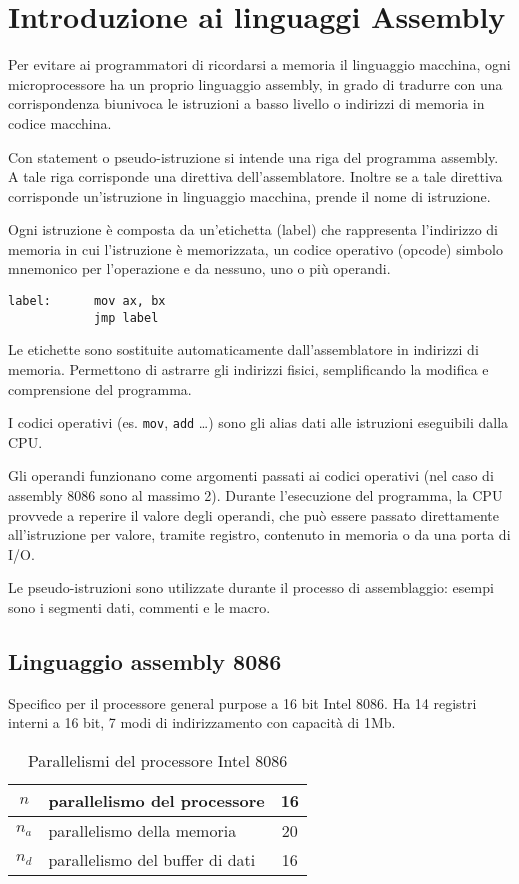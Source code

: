 \documentclass[../template]{subfiles}
\begin{document}
\section{Introduzione ai linguaggi Assembly}
Per evitare ai programmatori di ricordarsi a memoria il linguaggio macchina, ogni microprocessore ha un proprio
linguaggio assembly, in grado di tradurre con una corrispondenza biunivoca le istruzioni a basso livello o indirizzi di memoria in codice macchina.

Con statement o pseudo-istruzione si intende una riga del programma assembly. A tale riga corrisponde una direttiva
dell'assemblatore.  Inoltre se a tale direttiva corrisponde un'istruzione in linguaggio macchina, prende il nome di
istruzione.

Ogni istruzione è composta da un'etichetta (label) che rappresenta l'indirizzo di memoria in cui l'istruzione è
memorizzata, un codice operativo (opcode) simbolo mnemonico per l'operazione e da nessuno, uno o più operandi.

\begin{lstlisting}
label:      mov ax, bx
            jmp label
\end{lstlisting}

Le etichette sono sostituite automaticamente dall'assemblatore in indirizzi di memoria. Permettono di astrarre gli
indirizzi fisici, semplificando la modifica e comprensione del programma.

I codici operativi (es. \lstinline{mov}, \lstinline{add} \dots) sono gli alias dati alle istruzioni eseguibili dalla
CPU.

Gli operandi funzionano come argomenti passati ai codici operativi (nel caso di assembly 8086 sono al massimo 2).
Durante l'esecuzione del programma, la CPU provvede a reperire il valore degli operandi, che può essere passato
direttamente all'istruzione per valore, tramite registro, contenuto in memoria o da una porta di I/O.

Le pseudo-istruzioni sono utilizzate durante il processo di assemblaggio: esempi sono i segmenti dati, commenti  e le
macro.
\subsection{Linguaggio assembly 8086}
Specifico per il processore general purpose a 16 bit Intel 8086.
Ha 14 registri interni a 16 bit, 7 modi di indirizzamento con capacità di 1Mb.

\begin{table}[h]
    \centering
    \begin{tabu}{|c|l|c|}
        \hline
        $n$   & parallelismo del processore & 16\\
        \hline
        $n_a$ & parallelismo della memoria & 20\\
        \hline
        $n_d$ & parallelismo del buffer di dati & 16\\
        \hline
    \end{tabu}
    \caption{Parallelismi del processore Intel 8086}
\end{table}
\end{document}
